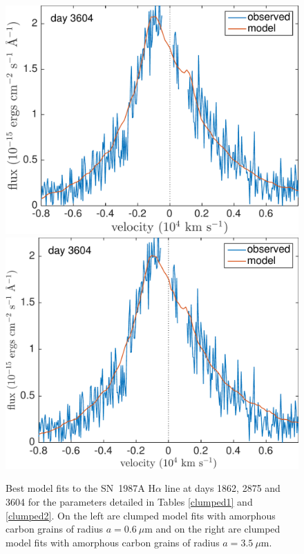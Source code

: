 \begin{figure}
\includegraphics[trim =0 0 0 -20,clip=true,scale=0.4]{chapters/chapter5/images/clump_1/best_fit/d3604Ha.pdf}
\includegraphics[trim =25 0 0 -20,clip=true,scale=0.4]{chapters/chapter5/images/clump_1/maximum/d3604Ha.pdf}
\vspace{8mm}
\caption{Best model fits to the SN~1987A H$\alpha$ line at days 1862, 2875 and 
3604 for the parameters detailed in Tables \ref{clumped1} and \ref{clumped2}. On the left are clumped model fits with amorphous carbon grains of radius $a=0.6~\mu$m and on the right are clumped model fits with amorphous carbon grains of radius $a=3.5~\mu$m.}
\label{d1862_3604}
\end{figure}

